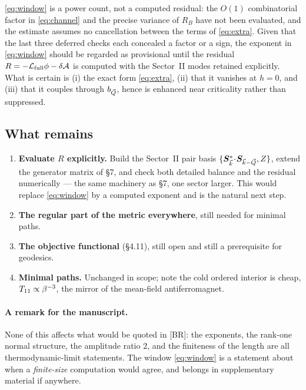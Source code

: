  \eqref{eq:window} is a power count, not a computed
residual: the $O(1)$ combinatorial factor in \eqref{eq:channel} and the precise variance of
$R_B$ have not been evaluated, and the estimate assumes no cancellation between the terms of
\eqref{eq:extra}. Given that the last three deferred checks each concealed a factor or a
sign, the exponent in \eqref{eq:window} should be regarded as provisional until the residual
$R=-\mathcal{L}_{\rm full}\phi-\delta\mathcal{A}$ is computed with the Sector~II modes retained explicitly.
What is certain is (i) the exact form \eqref{eq:extra}, (ii) that it vanishes at $h=0$, and
(iii) that it couples through $b_{\vec Q}$, hence is enhanced near criticality rather than
suppressed.

\subsection{What remains}
\begin{enumerate}
  \item \textbf{Evaluate $R$ explicitly.} Build the Sector~II pair basis
        $\{\bm S^{*}_{\vec k}\!\cdot\!\bm S_{\vec k-\vec Q}, Z\}$, extend the generator matrix of
        \S7, and check both detailed balance and the residual numerically --- the same
        machinery as \S7, one sector larger. This would replace \eqref{eq:window} by a
        computed exponent and is the natural next step.
  \item \textbf{The regular part of the metric everywhere}, still needed for minimal paths.
  \item \textbf{The objective functional} (\S4.11), still open and still a prerequisite for
        geodesics.
  \item \textbf{Minimal paths.} Unchanged in scope; note the cold ordered interior is cheap,
        $T_{11}\propto\beta^{-3}$, the mirror of the mean-field antiferromagnet.
\end{enumerate}

\paragraph{A remark for the manuscript.} None of this affects what would be quoted in
[BR]: the exponents, the rank-one normal structure, the amplitude ratio $2$, and the
finiteness of the length are all thermodynamic-limit statements. The window
\eqref{eq:window} is a statement about when a \emph{finite-size} computation would agree,
and belongs in supplementary material if anywhere.


